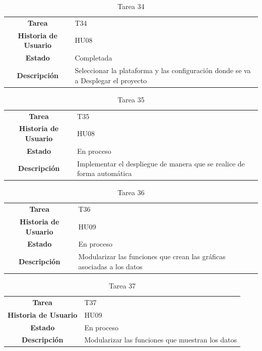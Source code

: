\begin{table}[H]
	\begin{center}
		\begin{tabular}{| c | p{9cm} |}
			\hline
			
			\textbf{Tarea} & T34 \\
			\textbf{Historia de Usuario} & HU08 \\
			\textbf{Estado} & Completada \\
			\textbf{Descripción} & Seleccionar la plataforma y las configuración donde se va a Desplegar el proyecto \\ \hline
		\end{tabular}
		\caption{Tarea 34}
	\end{center}
\end{table}

\begin{table}[H]
	\begin{center}
		\begin{tabular}{| c | p{9cm} |}
			\hline
			
			\textbf{Tarea} & T35 \\
			\textbf{Historia de Usuario} & HU08 \\
			\textbf{Estado} & En proceso \\
			\textbf{Descripción} & Implementar el despliegue de manera que se realice de forma automática \\ \hline
		\end{tabular}
		\caption{Tarea 35}
	\end{center}
\end{table}

\begin{table}[H]
	\begin{center}
		\begin{tabular}{| c | p{9cm} |}
			\hline
			
			\textbf{Tarea} & T36 \\
			\textbf{Historia de Usuario} & HU09 \\
			\textbf{Estado} & En proceso \\
			\textbf{Descripción} & Modularizar las funciones que crean las gráficas asociadas a los datos \\ \hline
		\end{tabular}
		\caption{Tarea 36}
	\end{center}
\end{table}

\begin{table}[H]
	\begin{center}
		\begin{tabular}{| c | p{9cm} |}
			\hline
			
			\textbf{Tarea} & T37 \\
			\textbf{Historia de Usuario} & HU09 \\
			\textbf{Estado} & En proceso \\
			\textbf{Descripción} & Modularizar las funciones que muestran los datos \\ \hline
		\end{tabular}
		\caption{Tarea 37}
	\end{center}
\end{table}

